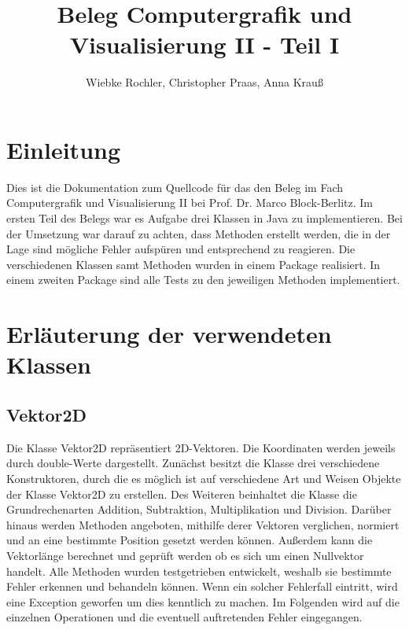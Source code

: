 \documentclass[a4paper,11pt]{scrartcl}
\title{Beleg Computergrafik und Visualisierung II - Teil I}
\author{Wiebke Rochler, Christopher Praas, Anna Krauß}
\begin{document}
\maketitle
\tableofcontents
\newpage
\section{Einleitung}
Dies ist die Dokumentation zum Quellcode für das den Beleg im Fach Computergrafik und Visualisierung II bei Prof. Dr. Marco Block-Berlitz. Im ersten Teil des Belegs war es Aufgabe drei Klassen in Java zu implementieren. Bei der Umsetzung war darauf zu achten, dass Methoden erstellt werden, die in der Lage sind mögliche Fehler aufspüren und entsprechend zu reagieren.
Die verschiedenen Klassen samt Methoden wurden in einem Package realisiert. In einem zweiten Package sind alle Tests zu den jeweiligen Methoden implementiert.
\newpage
\section{Erläuterung der verwendeten Klassen}
\subsection{Vektor2D}
Die Klasse Vektor2D repräsentiert 2D-Vektoren. Die Koordinaten werden jeweils durch double-Werte dargestellt. Zunächst besitzt die Klasse drei verschiedene Konstruktoren, durch die es möglich ist auf verschiedene Art und Weisen Objekte der Klasse Vektor2D zu erstellen. Des Weiteren beinhaltet die Klasse die Grundrechenarten Addition, Subtraktion, Multiplikation und Division. Darüber hinaus werden Methoden angeboten, mithilfe derer Vektoren verglichen, normiert und an eine bestimmte Position gesetzt werden können. Außerdem kann die Vektorlänge berechnet und geprüft werden ob es sich um einen Nullvektor handelt. Alle Methoden wurden testgetrieben entwickelt, weshalb sie bestimmte Fehler erkennen und behandeln können. Wenn ein solcher Fehlerfall eintritt, wird eine Exception geworfen um dies kenntlich zu machen. Im Folgenden wird auf die einzelnen Operationen und die eventuell auftretenden Fehler eingegangen.
\end{document}
